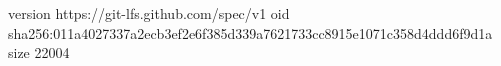 version https://git-lfs.github.com/spec/v1
oid sha256:011a4027337a2ecb3ef2e6f385d339a7621733cc8915e1071c358d4ddd6f9d1a
size 22004
